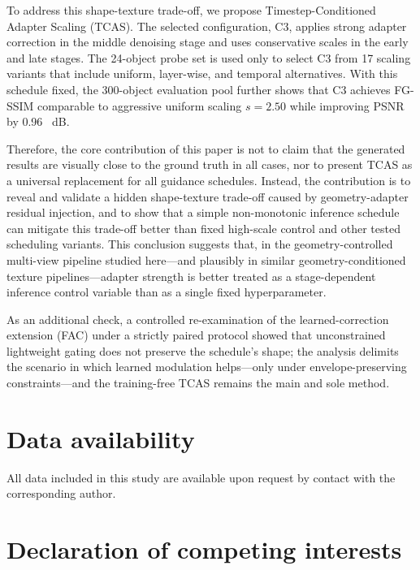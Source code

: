 \documentclass[times,twocolumn,final]{elsarticle}
\providecommand{\DIFadd}[1]{{\protect\color{blue} \sf #1}} %
\providecommand{\DIFaddbegin}{} %
\providecommand{\DIFaddend}{} %
\newcommand{\DIFaddincludegraphics}[2][]{{\color{blue}\fbox{\DIFOincludegraphics[#1]{#2}}}} %
\DeclareRobustCommand{\DIFaddbegin}{\DIFOaddbegin \let\includegraphics\DIFaddincludegraphics} %
\DeclareRobustCommand{\DIFaddend}{\DIFOaddend \let\includegraphics\DIFOincludegraphics} %
\begin{document}
To address this shape-texture trade-off, we propose Timestep-Conditioned Adapter Scaling (TCAS). The selected configuration, C3, applies strong adapter correction in the middle denoising stage and uses conservative scales in the early and late stages. The 24-object probe set is used only to select C3 from 17 scaling variants that include uniform, layer-wise, and temporal alternatives. With this schedule fixed, the 300-object   \DIFaddbegin \DIFadd{evaluation pool }\DIFaddend further shows that C3 achieves FG-SSIM comparable to aggressive uniform scaling $s = 2.50$ while improving PSNR by 0.96\DIFaddbegin \DIFadd{~}\DIFaddend dB.

Therefore, the core contribution of this paper is not to claim that the generated results are visually close to the ground truth in all cases, nor to present TCAS as a universal replacement for all guidance schedules. Instead, the contribution is to reveal and validate a hidden shape-texture trade-off caused by geometry-adapter residual injection, and to show that a simple non-monotonic inference schedule can mitigate this trade-off better than fixed high-scale control and other tested scheduling variants. This conclusion suggests that, in \DIFaddbegin \DIFadd{the }\DIFaddend geometry-controlled multi-view   \DIFaddbegin \DIFadd{pipeline studied here---and plausibly in similar geometry-conditioned texture pipelines---adapter strength is better }\DIFaddend treated as a stage-dependent inference control variable   \DIFaddbegin \DIFadd{than as }\DIFaddend a single fixed hyperparameter.

  \DIFaddbegin \DIFadd{As an additional check, a controlled re-examination of the learned-correction extension (FAC) under a strictly paired protocol showed that unconstrained lightweight gating does not preserve the schedule's shape; the analysis delimits the scenario in which learned modulation helps---only under envelope-preserving constraints---and }\DIFaddend the   \DIFaddbegin \DIFadd{training-free TCAS remains the main and sole method}\DIFaddend .

  \DIFaddbegin \section*{\DIFadd{Data availability}}
\DIFaddend

\DIFaddbegin \DIFadd{All data included in this study are available upon request by contact with the corresponding author.
}

\section*{\DIFadd{Declaration of competing interests}}
\end{document}
